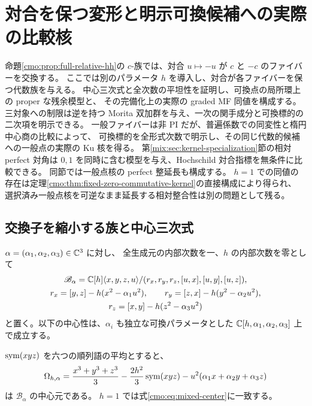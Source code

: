 \section{対合を保つ変形と明示可換候補への実際の比較核}
\label{mix:sec:equivariant-deformation}

命題\ref{cmo:prop:full-relative-hh}の $c$-族では、対合 $u\mapsto-u$ が
$c$ と $-c$ のファイバーを交換する。
ここでは別のパラメータ $h$ を導入し、対合が各ファイバーを保つ代数族を与える。
中心三次式と全次数の平坦性を証明し、可換点の局所環上の proper な残余模型と、
その完備化上の実際の graded MF 同値を構成する。
三対象への制限は逆を持つ Morita 双加群を与え、一次の関手成分と可換標的の二次項を明示できる。
一般ファイバーは非 PI だが、普遍係数での同変性と楕円中心商の比較によって、
可換標的を全形式次数で明示し、その同じ代数的候補への一般点の実際の Ku 核を得る。
第\ref{mix:sec:kernel-specialization}節の相対 perfect 対角は
$0,1$ を同時に含む模型を与え、Hochschild 対合指標を無条件に比較できる。
同節では一般点核の perfect 整延長も構成する。
$h=1$ での同値の存在は定理\ref{cmo:thm:fixed-zero-commutative-kernel}の直接構成により得られ、
選択済み一般点核を可逆なまま延長する相対整合性は別の問題として残る。

\subsection{交換子を縮小する族と中心三次式}

$\alpha=(\alpha_1,\alpha_2,\alpha_3)\in\mathbb C^3$ に対し、
全生成元の内部次数を一、$h$ の内部次数を零として
\begin{equation}\label{mix:eq:h-relations}
\begin{gathered}
 \mathscr B_\alpha
 =\mathbb C[h]\langle x,y,z,u\rangle/
 (r_x,r_y,r_z,[u,x],[u,y],[u,z]),\\
 r_x=[y,z]-h(x^2-\alpha_1u^2),\qquad
 r_y=[z,x]-h(y^2-\alpha_2u^2),\\
 r_z=[x,y]-h(z^2-\alpha_3u^2)
\end{gathered}
\end{equation}
と置く。以下の中心性は、$\alpha_i$ も独立な可換パラメータとした
$\mathbb C[h,\alpha_1,\alpha_2,\alpha_3]$ 上で成立する。

\begin{proposition}[交換子パラメータを持つ中心三次式]
\label{mix:prop:h-central}
$\operatorname{sym}(xyz)$ を六つの順列語の平均とすると、
\begin{equation}\label{mix:eq:h-central}
 \Omega_{h,\alpha}
 =\frac{x^3+y^3+z^3}{3}
   -\frac{2h^2}{3}\operatorname{sym}(xyz)
   -u^2(\alpha_1x+\alpha_2y+\alpha_3z)
\end{equation}
は $\mathscr B_\alpha$ の中心元である。
$h=1$ では式\eqref{cmo:eq:mixed-center}に一致する。
\end{proposition}

